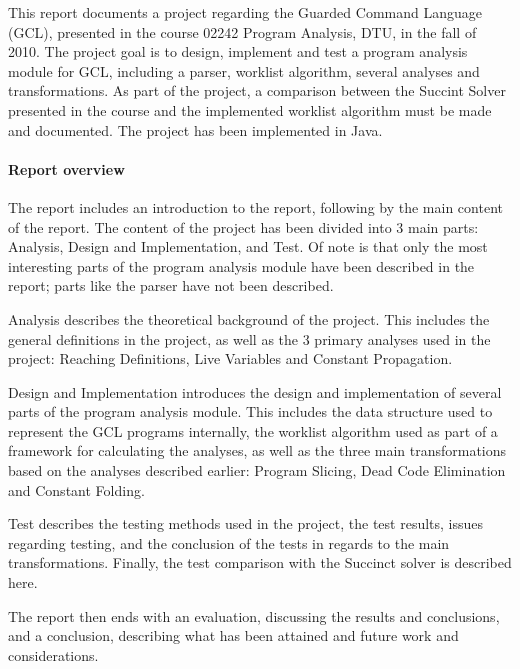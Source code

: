 This report documents a project regarding the
Guarded Command Language (GCL), presented in the course 02242
Program Analysis, DTU, in the fall of 2010.
The project goal is to design, implement and test
a program analysis module for GCL, including a parser,
worklist algorithm, several analyses and transformations.
As part of the project, a comparison between the Succint Solver
presented in the course and the implemented worklist algorithm
must be made and documented.
The project has been implemented in Java.

\paragraph{Report overview}

The report includes an introduction to the report, following by the main
content of the report. The content of the project has been divided into
3 main parts: Analysis, Design and Implementation, and Test.
Of note is that only the most interesting parts of the program analysis
module have been described in the report; parts like the parser have not
been described.

Analysis describes the theoretical background
of the project. This includes the general definitions in
the project, as well as the 3 primary analyses used in
the project: Reaching Definitions, Live Variables and
Constant Propagation.

Design and Implementation introduces the design
and implementation of several parts of the program
analysis module. This includes the data structure used to
represent the GCL programs internally, the worklist algorithm
used as part of a framework for calculating the analyses,
as well as the three main transformations based on
the analyses described earlier: Program Slicing,
Dead Code Elimination and Constant Folding.

Test describes the testing methods used in
the project, the test results, issues regarding testing,
and the conclusion of the tests in regards to the
main transformations. Finally, the test comparison
with the Succinct solver is described here.

The report then ends with an evaluation, discussing the
results and conclusions, and a conclusion, describing
what has been attained and future work and considerations.

